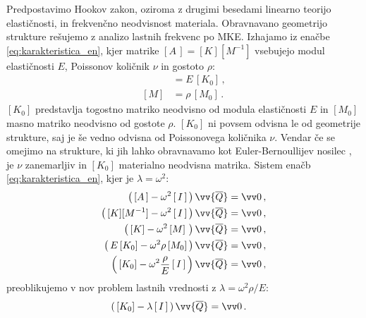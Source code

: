             Predpostavimo Hookov zakon, oziroma z drugimi besedami linearno teorijo elastičnosti, in frekvenčno neodvisnost materiala. Obravnavano geometrijo strukture rešujemo z analizo lastnih frekvenc po MKE. Izhajamo iz enačbe \ref{eq:karakteristica_en}, kjer matrike $[A\,]=[K][M^{-1}]$ vsebujejo modul elastičnosti $E$, Poissonov količnik $\nu$ in gostoto $\rho$:
            \begin{align}
                [K]&=E \, [K_0] \,,\\
                [M]&=\rho \, [M_0]\,.
            \end{align}
            $[K_0]$ predstavlja togostno matriko neodvisno od modula elastičnosti $E$ in $[M_0]$ masno matriko neodvisno od gostote $\rho$. $[K_0]$ ni povsem odvisna le od geometrije strukture, saj je še vedno odvisna od Poissonovega količnika $\nu$. Vendar če se omejimo na strukture, ki jih lahko obravnavamo kot Euler-Bernoullijev nosilec \cite{rao2007ContinuousSystems}, je $\nu$ zanemarljiv in $[K_0]$ materialno neodvisna matrika. Sistem enačb \eqref{eq:karakteristica_en}, kjer je $\lambda=\omega^2$:
            \begin{align}
                \left(\,[A\,] - \omega^2 \, [\,I\,] \, \right) \vv{\overline{Q}}&=\vv 0 \nonumber \,,\\
                \left(\,[K][M^{-1}] - \omega^2 \, [\,I\,] \, \right) \vv{\overline{Q}}&=\vv 0 \nonumber \,,\\
                \left(\,[K] - \omega^2 \, [M] \, \, \right) \vv{\overline{Q}}&=\vv 0 \nonumber \,,\\
                \left(\,E \, [K_0]-\omega^2 \rho \, [M_0] \, \right) \vv{\overline{Q}}&=\vv 0 \nonumber \,,\\
                \left( \, [K_0]-\omega^2 \frac{\rho}{E} \, [\,I\,] \, \right) \vv{\overline{Q}}&=\vv 0 \,,\nonumber
            \end{align}
            preoblikujemo v nov problem lastnih vrednosti z $\lambda=\omega^2 \rho / E$:
            \begin{align}
                \left( \, [K_0]- \lambda \, [\,I\,] \, \right) \vv{\overline{Q}}&=\vv 0 \,.
            \end{align}
            
